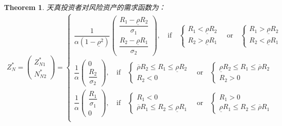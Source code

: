 \documentclass[10.0pt]{article}
\newtheorem{thm}{Theorem}
\begin{document}
\begin{thm}

天真投资者对风险资产的需求函数为：
\begin{eqnarray}
Z_N^* = \left( \begin{matrix} Z_{N 1}^* \\ N_{N 2}^* \end{matrix} \right) = \left\{ \begin{matrix}
\dfrac1{\alpha (1 - \underline{\rho}^2)} \left( \begin{matrix} \dfrac{R_1 - \underline{\rho} R_2}{\sigma_1} \\ \dfrac{R_2 - \underline{\rho} R_1}{\sigma_2} \end{matrix} \right), \quad \text{if} \quad \left\{ \begin{matrix} R_1 < \underline{\rho} R_2 \\ R_2 > \underline{\rho} R_1 \end{matrix} \right. \quad \text{or} \quad \left\{ \begin{matrix} R_1 > \underline{\rho} R_2 \\ R_2 < \underline{\rho} R_1 \end{matrix} \right. \\
\dfrac1{\alpha} \left( \begin{matrix} 0 \\ \dfrac{R_2}{\sigma_2} \end{matrix} \right), \quad \text{if} \quad \left\{ \begin{matrix} \overline{\rho} R_2 \leqslant R_1 \leqslant \underline{\rho} R_2 \\ R_2 < 0 \end{matrix} \right. \quad \text{or} \quad \left\{ \begin{matrix} \underline{\rho} R_2 \leqslant R_1 \leqslant \overline{\rho} R_2 \\ R_2 > 0 \end{matrix} \right. \\
\dfrac1{\alpha} \left( \begin{matrix} \dfrac{R_1}{\sigma_1} \\ 0 \end{matrix} \right), \quad \text{if} \quad \left\{ \begin{matrix} R_1 < 0 \\ \overline{\rho} R_1 \leqslant R_2 \leqslant \underline{\rho} R_1 \end{matrix} \right. \quad \text{or} \quad \left\{ \begin{matrix} R_1 > 0 \\ \underline{\rho} R_1 \leqslant R_2 \leqslant \overline{\rho} R_1 \end{matrix} \right. \\

\end{matrix}
\end{eqnarray}
\end{thm}
\end{document}
